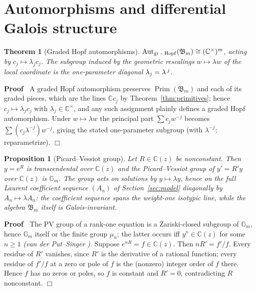 \documentclass{article}
\newcommand{\tmem}[1]{{\em #1\/}}
\newcommand{\tmop}[1]{\ensuremath{\operatorname{#1}}}
\newenvironment{proof}{\noindent\textbf{Proof\ }}{\hspace*{\fill}$\Box$\medskip}
\newtheorem{proposition}{Proposition}
{\theorembodyfont{\rmfamily}\newtheorem{remark}{Remark}}
\newtheorem{theorem}{Theorem}
\newcommand{\Prim}{\tmop{Prim}}
\newcommand{\Aut}{\tmop{Aut}}
\newcommand{\CA}{\mathfrak{B}}
\newcommand{\C}{\mathbb{C}}
\begin{document}
\section{Automorphisms and differential Galois structure}\label{sec:aut}

\begin{theorem}
  [Graded Hopf automorphisms]\label{thm:aut} $\Aut_{\textrm{\tmop{gr} \text{-}
  \tmop{Hopf}}} (\CA_m) \cong (\C^{\times})^m$, acting by $c_j \mapsto
  \lambda_j c_j$. The subgroup induced by the geometric rescalings $w \mapsto
  \lambda w$ of the local coordinate is the one-parameter diagonal $\lambda_j
  = \lambda^{\hspace{0.17em} j}$.
\end{theorem}

\begin{proof}
  A graded Hopf automorphism preserves $\Prim (\CA_m)$ and each of its graded
  pieces, which are the lines $\C c_j$ by Theorem~\ref{thm:primitives}; hence
  $c_j \mapsto \lambda_j c_j$ with $\lambda_j \in \C^{\times}$, and any such
  assignment plainly defines a graded Hopf automorphism. Under $w \mapsto
  \lambda w$ the principal part $\sum c_j w^{- j}$ becomes $\sum (c_j
  \lambda^{- j}) w^{- j}$, giving the stated one-parameter subgroup (with
  $\lambda^{- j}$; reparametrize).
\end{proof}

\begin{proposition}
  [Picard--Vessiot group]\label{prop:galois} Let $R \in \C (z)$ be
  nonconstant. Then $y = e^R$ is transcendental over $\C (z)$ and the
  Picard--Vessiot group of $y' = R' y$ over $\C (z)$ is $\mathbb{G}_m$. The
  group acts on solutions by $y \mapsto \lambda y$, hence on the full Laurent
  coefficient sequence $(A_n)$ of Section~\ref{sec:model} diagonally by $A_n
  \mapsto \lambda A_n$: the coefficient sequence spans the weight-one isotypic
  line, while the algebra $\CA_m$ itself is Galois-invariant.
\end{proposition}

\begin{proof}
  The PV group of a rank-one equation is a Zariski-closed subgroup of
  $\mathbb{G}_m$, hence $\mathbb{G}_m$ itself or the finite group $\mu_n$; the
  latter occurs iff $y^n \in \C (z)$ for some $n \ge 1$ {\tmem{(van der
  Put--Singer {\cite[Ex.~1.19, {\textsection}1.4]{vdPS}})}}. Suppose $e^{nR} =
  f \in \C (z)$. Then $nR' = f' / f$. Every residue of $R'$ vanishes, since
  $R'$ is the derivative of a rational function; every residue of $f' / f$ at
  a zero or pole of $f$ is the (nonzero) integer order of $f$ there. Hence $f$
  has no zeros or poles, so $f$ is constant and $R' = 0$, contradicting $R$
  nonconstant.
\end{proof}
\end{document}
